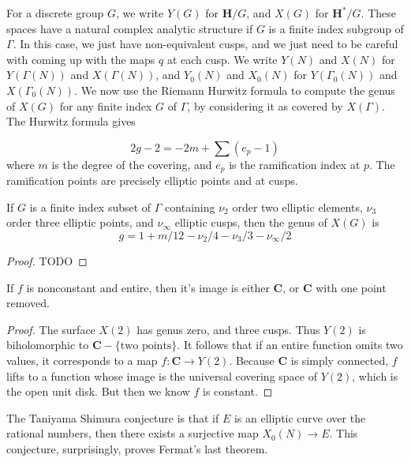 For a discrete group $G$, we write $Y(G)$ for $\mathbf{H}/G$, and $X(G)$ for $\mathbf{H}^*/G$. These spaces have a natural complex analytic structure if $G$ is a finite index subgroup of $\Gamma$. In this case, we just have non-equivalent cusps, and we just need to be careful with coming up with the maps $q$ at each cusp. We write $Y(N)$ and $X(N)$ for $Y(\Gamma(N))$ and $X(\Gamma(N))$, and $Y_0(N)$ and $X_0(N)$ for $Y(\Gamma_0(N))$ and $X(\Gamma_0(N))$. We now use the Riemann Hurwitz formula to compute the genus of $X(G)$ for any finite index $G$ of $\Gamma$, by considering it as covered by $X(\Gamma)$. The Hurwitz formula gives

\[ 2g - 2 = -2m + \sum (e_p - 1) \]
%
where $m$ is the degree of the covering, and $e_p$ is the ramification index at $p$. The ramification points are precisely elliptic points and at cusps.

\begin{theorem}
    If $G$ is a finite index subset of $\Gamma$ containing $\nu_2$ order two elliptic elements, $\nu_3$ order three elliptic points, and $\nu_\infty$ elliptic cusps, then the genus of $X(G)$ is
    \[ g = 1 + m/12 - \nu_2/4 - \nu_3/3 - \nu_\infty/2 \]
\end{theorem}
\begin{proof}
    TODO
\end{proof}

\begin{corollary}
    If $f$ is nonconstant and entire, then it's image is either $\mathbf{C}$, or $\mathbf{C}$ with one point removed.
\end{corollary}
\begin{proof}
    The surface $X(2)$ has genus zero, and three cusps. Thus $Y(2)$ is biholomorphic to $\mathbf{C} - \{ \text{two points} \}$. It follows that if an entire function omits two values, it corresponds to a map $f: \mathbf{C} \to Y(2)$. Because $\mathbf{C}$ is simply connected, $f$ lifts to a function whose image is the universal covering space of $Y(2)$, which is the open unit disk. But then we know $f$ is constant.
\end{proof}

\begin{remark}
    The Taniyama Shimura conjecture is that if $E$ is an elliptic curve over the rational numbers, then there exists a surjective map $X_0(N) \to E$. This conjecture, surprisingly, proves Fermat's last theorem.
\end{remark}

